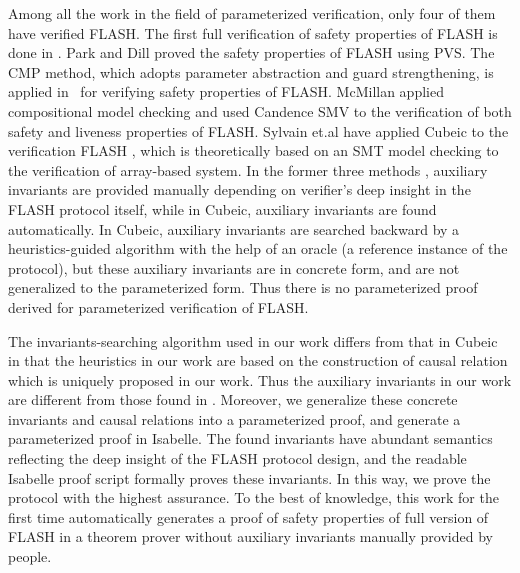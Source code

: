 \documentclass[final]{IEEEtran}
\begin{document}
{Among all the work in the  field of parameterized verification, only four of them have verified FLASH. The first full verification of safety properties of FLASH is done in \cite{Park1996a}. Park and Dill  proved the safety properties of FLASH using  PVS. %
The CMP method, which adopts parameter abstraction and guard strengthening, is applied %
in~\cite{Chou2004} for verifying  safety properties  of
FLASH.  %
McMillan applied compositional
model checking \cite{McMillan2001}  and used Candence SMV  to the verification of both safety and liveness properties of FLASH. Sylvain et.al have applied Cubeic to the verification FLASH \cite{cubicle2011,Conchon2013}, which is theoretically based on an SMT  model checking to the verification of array-based system.
 In the  former three methods \cite{Park1996a,Chou2004,McMillan2001}, auxiliary invariants are provided manually depending on verifier's deep insight in the FLASH protocol itself, while in Cubeic, auxiliary invariants are found automatically.  In  Cubeic, auxiliary invariants are searched backward  by a heuristics-guided algorithm with the help of an oracle (a reference instance of the protocol), but these auxiliary invariants are in concrete form, and are not generalized to the parameterized form. Thus there is no  parameterized proof derived for parameterized verification of FLASH.


The invariants-searching  algorithm used in our work differs from that in Cubeic \cite{cubicle2011,Conchon2013} in that the heuristics in our work are based on the construction of causal relation which is uniquely proposed in our work. Thus the auxiliary invariants in our work are different from those found in \cite{cubicle2011,Conchon2013}. Moreover, we generalize these concrete invariants and causal relations into a parameterized proof, and  generate a parameterized proof in Isabelle. The found invariants have abundant semantics reflecting the deep insight   of the FLASH protocol design, and the readable Isabelle proof script formally proves these invariants. In this way, we prove the protocol with the highest assurance. To the best of knowledge, this work for the first time automatically generates a proof of safety properties of full version of FLASH in a theorem prover without auxiliary invariants manually provided by people.






}
\end{document}
